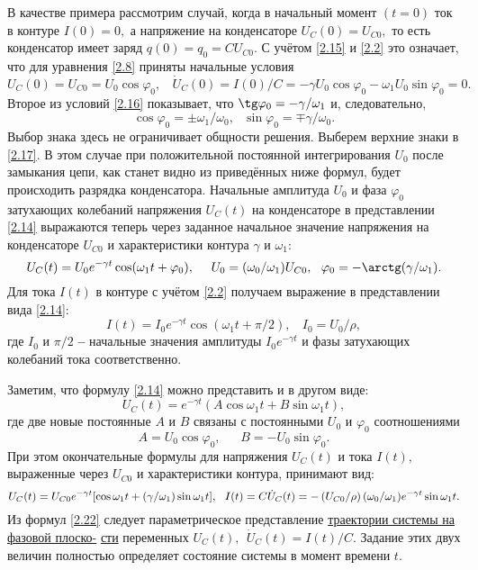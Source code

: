 В качестве примера рассмотрим случай, когда в начальный момент $(t=0)$ ток в контуре $I(0)=0,$ а напряжение на конденсаторе $U_C(0)=U_{C0},$ то есть конденсатор имеет заряд $q(0)=q_0=CU_{C0}.$ С учётом \eqref{2.15} и \eqref{2.2} это означает, что для уравнения \eqref{2.8} приняты на\-чальные условия
{\large
\begin{equation}\label{2.16}
U_C(0)=U_{C0}=U_0\cos\varphi_0,~~~~\dot{U}_C(0)=I(0)/C=-\gamma U_0\cos\varphi_0-\omega_1U_0\sin\varphi_0=0.
\end{equation}}
Второе из условий \eqref{2.16} показывает, что $\tg\varphi_0=-\gamma/\omega_1$ и, следовательно,
\begin{equation}\label{2.17}
\cos\varphi_0=\pm\omega_1/\omega_0,~~~\sin\varphi_0=\mp\gamma/\omega_0.
\end{equation}
Выбор знака здесь не ограничивает общности решения. Выберем верхние знаки в \eqref{2.17}. В этом случае при положительной постоянной интегрирования $U_0$ после замыкания цепи, как станет видно из приведённых ниже формул, будет происходить разрядка конденсатора. Начальные амплитуда $U_0$ и фаза $\varphi_0$ затухающих колебаний напряжения $U_C(t)$ на конденсаторе в пред\-ставлении \eqref{2.14} выражаются теперь через заданное начальное значение напряжения на конден\-саторе $U_{C0}$ и характеристики контура $\gamma$ и $\omega_1:$
\begin{equation}\label{2.18}
U_C(t)=U_0e^{-\gamma t}\cos(\omega_1t+\varphi_0),~~~~U_0=(\omega_0/\omega_1)U_{C0},~~\varphi_0=-\arctg(\gamma/\omega_1).
\end{equation}
Для тока $I(t)$ в контуре с учётом \eqref{2.2} получаем выражение в представлении вида \eqref{2.14}:
\begin{equation}\label{2.19}
I(t)=I_0e^{-\gamma t}\cos(\omega_1t+\pi/2),~~~~I_0=U_0/\rho,
\end{equation}
где $I_0$ и $\pi/2$ \textbf{--} начальные значения амплитуды $I_0e^{-\gamma t}$ и фазы затухающих колебаний тока со\-ответственно.

Заметим, что формулу \eqref{2.14} можно представить и в другом виде:			
\begin{equation}\label{2.20}
U_C(t)=e^{-\gamma t}(A\cos\omega_1 t+B\sin\omega_1 t),
\end{equation}
где две новые постоянные $A$ и $B$ связаны с постоянными $U_0$ и $\varphi_0$ соотношениями
\begin{equation}\label{2.21}
A=U_0\cos\varphi_0,~~~~~~~B=-U_0\sin\varphi_0.
\end{equation}
При этом окончательные формулы для напряжения $U_C(t)$ и тока $I(t),$ выраженные через $U_{C0}$ и характеристики контура, принимают вид:
{\large
\begin{equation}\label{2.22}
U_C(t)=U_{C0}e^{-\gamma t}[\cos\omega_1t+(\gamma/\omega_1)\sin\omega_1t],~~I(t)=C\dot{U}_C(t)
=-\left(U_{C0}/\rho\right)(\omega_0/\omega_1)e^{-\gamma t}\sin\omega_1t.\\
\end{equation}}
Из формул \eqref{2.22} следует параметрическое представление \underline{траектории системы на фазовой пло\-ско-} \underline{сти} переменных $U_C(t),~~\dot{U}_C(t)=I(t)/C.$ Задание этих двух величин полностью опреде\-ляет состояние системы в момент времени $t.$

